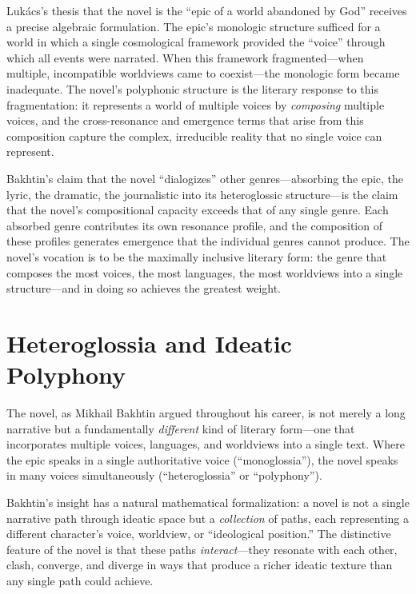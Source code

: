 \begin{interpretation}
\label{interp:novel-replaces-epic}
Luk\'acs's thesis that the novel is the ``epic of a world abandoned by God'' receives a precise algebraic formulation.  The epic's monologic structure sufficed for a world in which a single cosmological framework provided the ``voice'' through which all events were narrated.  When this framework fragmented---when multiple, incompatible worldviews came to coexist---the monologic form became inadequate.  The novel's polyphonic structure is the literary response to this fragmentation: it represents a world of multiple voices by \emph{composing} multiple voices, and the cross-resonance and emergence terms that arise from this composition capture the complex, irreducible reality that no single voice can represent.

Bakhtin's claim that the novel ``dialogizes'' other genres---absorbing the epic, the lyric, the dramatic, the journalistic into its heteroglossic structure---is the claim that the novel's compositional capacity exceeds that of any single genre.  Each absorbed genre contributes its own resonance profile, and the composition of these profiles generates emergence that the individual genres cannot produce.  The novel's vocation is to be the maximally inclusive literary form: the genre that composes the most voices, the most languages, the most worldviews into a single structure---and in doing so achieves the greatest weight.
\end{interpretation}

\section{Heteroglossia and Ideatic Polyphony}

The novel, as Mikhail Bakhtin argued throughout his career, is not merely a
long narrative but a fundamentally \emph{different} kind of literary form---one
that incorporates multiple voices, languages, and worldviews into a single
text.  Where the epic speaks in a single authoritative voice (``monoglossia''),
the novel speaks in many voices simultaneously (``heteroglossia'' or
``polyphony'').

Bakhtin's insight has a natural mathematical formalization: a novel is not a
single narrative path through ideatic space but a \emph{collection} of paths,
each representing a different character's voice, worldview, or ``ideological
position.''  The distinctive feature of the novel is that these paths
\emph{interact}---they resonate with each other, clash, converge, and diverge
in ways that produce a richer ideatic texture than any single path could
achieve.


